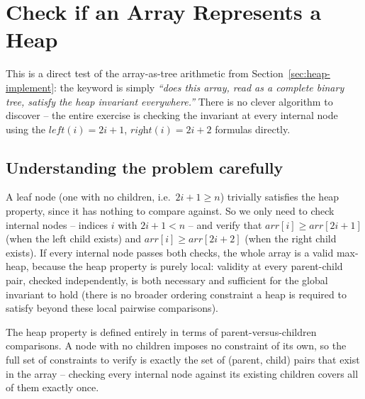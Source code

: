 \section{Check if an Array Represents a Heap}
\label{sec:heap-check-array}


\begin{patternbox}
This is a direct test of the array-as-tree arithmetic from
Section~\ref{sec:heap-implement}: the keyword is simply \emph{``does this
array, read as a complete binary tree, satisfy the heap invariant
everywhere.''} There is no clever algorithm to discover -- the entire
exercise is checking the invariant at every internal node using the
$\textit{left}(i) = 2i+1$, $\textit{right}(i) = 2i+2$ formulas directly.
\end{patternbox}

\subsection*{Understanding the problem carefully}

A leaf node (one with no children, i.e.\ $2i+1 \ge n$) trivially satisfies
the heap property, since it has nothing to compare against. So we only need
to check internal nodes -- indices $i$ with $2i+1 < n$ -- and verify that
$\textit{arr}[i] \ge \textit{arr}[2i+1]$ (when the left child exists) and
$\textit{arr}[i] \ge \textit{arr}[2i+2]$ (when the right child exists). If
every internal node passes both checks, the whole array is a valid
max-heap, because the heap property is purely local: validity at every
parent-child pair, checked independently, is both necessary and sufficient
for the global invariant to hold (there is no broader ordering constraint
a heap is required to satisfy beyond these local pairwise comparisons).

\begin{ideabox}
The heap property is defined entirely in terms of parent-versus-children
comparisons. A node with no children imposes no constraint of its own, so
the full set of constraints to verify is exactly the set of (parent, child)
pairs that exist in the array -- checking every internal node against its
existing children covers all of them exactly once.
\end{ideabox}


